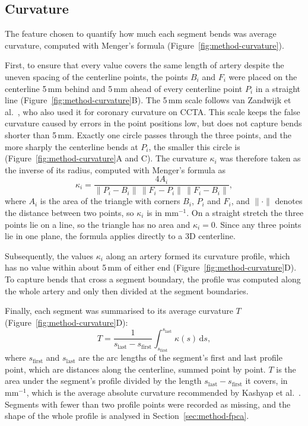 \subsection{Curvature}
\label{sec:method-curvature}


The feature chosen to quantify how much each segment bends was average curvature, computed with Menger's formula (Figure~\ref{fig:method-curvature}).

First, to ensure that every value covers the same length of artery despite the uneven spacing of the centerline points, the points $B_i$ and $F_i$ were placed on the centerline 5\,mm behind and 5\,mm ahead of every centerline point $P_i$ in a straight line (Figure~\ref{fig:method-curvature}B).
The 5\,mm scale follows van Zandwijk et al.\ \cite{vanzandwijk2019curvature}, who also used it for coronary curvature on CCTA.
This scale keeps the false curvature caused by errors in the point positions low, but does not capture bends shorter than 5\,mm.
Exactly one circle passes through the three points, and the more sharply the centerline bends at $P_i$, the smaller this circle is (Figure~\ref{fig:method-curvature}A and C).
The curvature $\kappa_i$ was therefore taken as the inverse of its radius, computed with Menger's formula \cite{menger1930metrik} as
\begin{equation}
  \kappa_i = \frac{4 A_i}{\lVert P_i - B_i \rVert \, \lVert F_i - P_i \rVert \, \lVert F_i - B_i \rVert} ,
  \label{eq:method-profile}
\end{equation}
where $A_i$ is the area of the triangle with corners $B_i$, $P_i$ and $F_i$, and $\lVert \cdot \rVert$ denotes the distance between two points, so $\kappa_i$ is in mm$^{-1}$.
On a straight stretch the three points lie on a line, so the triangle has no area and $\kappa_i = 0$.
Since any three points lie in one plane, the formula applies directly to a 3D centerline.

Subsequently, the values $\kappa_i$ along an artery formed its curvature profile, which has no value within about 5\,mm of either end (Figure~\ref{fig:method-curvature}D).
To capture bends that cross a segment boundary, the profile was computed along the whole artery and only then divided at the segment boundaries.

Finally, each segment was summarised to its average curvature $T$ (Figure~\ref{fig:method-curvature}D):
\begin{equation}
  T = \frac{1}{s_{\mathrm{last}} - s_{\mathrm{first}}} \int_{s_{\mathrm{first}}}^{s_{\mathrm{last}}} \kappa(s)\,\mathrm{d}s ,
  \label{eq:method-tl}
\end{equation}
where $s_{\mathrm{first}}$ and $s_{\mathrm{last}}$ are the arc lengths of the segment's first and last profile point, which are distances along the centerline, summed point by point.
$T$ is the area under the segment's profile divided by the length $s_{\mathrm{last}} - s_{\mathrm{first}}$ it covers, in mm$^{-1}$, which is the average absolute curvature recommended by Kashyap et al.\ \cite{kashyap2022tortuosity}.
Segments with fewer than two profile points were recorded as missing, and the shape of the whole profile is analysed in Section~\ref{sec:method-fpca}.

